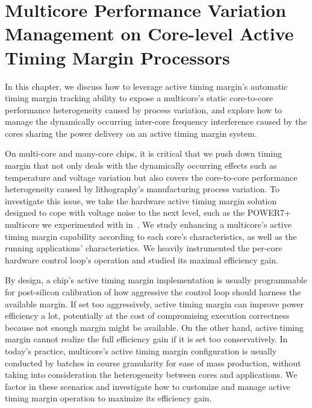 
\chapter{Multicore Performance Variation Management on Core-level Active Timing Margin Processors}
\label{sec:process}

In this chapter, we discuss how to leverage active timing margin's automatic timing margin tracking ability to expose a multicore's static core-to-core performance heterogeneity caused by process variation, and explore how to manage the dynamically occurring inter-core frequency interference caused by the cores sharing the power delivery on an active timing margin system.

On multi-core and many-core chips, it is critical that we push down timing margin that not only deals with the dynamically occurring effects such as temperature and voltage variation but also covers the core-to-core performance heterogeneity caused by lithography's manufacturing process variation. To investigate this issue, we take the hardware active timing margin solution designed to cope with voltage noise to the next level, such as the POWER7+ multicore we experimented with in~. We study enhancing a multicore's active timing margin capability according to each core's characteristics, as well as the running applications' characteristics. We heavily instrumented the per-core hardware control loop's operation and studied its maximal efficiency gain.

By design, a chip's active timing margin implementation is usually programmable for post-silicon calibration of how aggressive the control loop should harness the available margin. If set too aggressively, active timing margin can improve power efficiency a lot, potentially at the cost of compromising execution correctness because not enough margin might be available. On the other hand, active timing margin cannot realize the full efficiency gain if it is set too conservatively. In today's practice, multicore's active timing margin configuration is usually conducted by batches in course granularity for ease of mass production, without taking into consideration the heterogeneity between cores and applications. We factor in these scenarios and investigate how to customize and manage active timing margin operation to maximize its efficiency gain.

